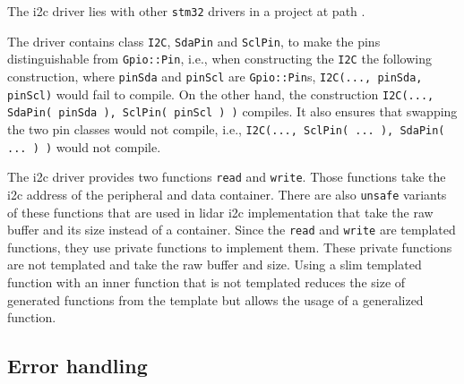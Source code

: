 \documentclass[
  digital,     %
  oneside,     %
  nosansbold,  %
  nocolorbold, %
  nolof,         %
  nolot,         %
]{fithesis4}
\begin{document}
{{{The \acrshort{i2c} driver lies with other \verb|stm32| drivers in a project at path .

The driver contains class \lstinline|I2C|, \lstinline|SdaPin| and \lstinline|SclPin|, to make the pins distinguishable from \lstinline|Gpio::Pin|, i.e., when constructing the \lstinline|I2C| the following construction, where \lstinline|pinSda| and \lstinline|pinScl| are \lstinline|Gpio::Pin|s, \lstinline|I2C(..., pinSda, pinScl)| would fail to compile. On the other hand, the construction \lstinline|I2C(..., SdaPin( pinSda ), SclPin( pinScl ) )| compiles. It also ensures that swapping the two pin classes would not compile, i.e., \lstinline|I2C(..., SclPin( ... ), SdaPin( ... ) )| would not compile.

The \acrshort{i2c} driver provides two functions \lstinline|read| and \lstinline|write|. Those functions take the \acrshort{i2c} address of the peripheral and data container. There are also \lstinline|unsafe| variants of these functions that are used in \acrshort{lidar} \acrshort{i2c} implementation %
that take the raw buffer and its size instead of a container. Since the \lstinline|read| and \lstinline|write| are templated functions, they use private functions to implement them. These private functions are not templated and take the raw buffer and size. Using a slim templated function with an inner function that is not templated reduces the size of generated functions from the template but allows the usage of a generalized function.

\subsection{ Error handling }

}}}
\end{document}

